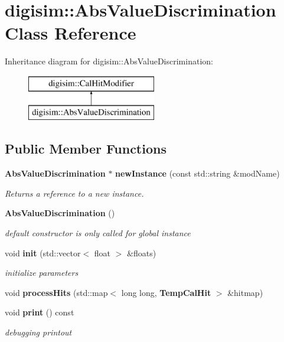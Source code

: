 \section{digisim\-:\-:Abs\-Value\-Discrimination Class Reference}
\label{classdigisim_1_1AbsValueDiscrimination}
Inheritance diagram for digisim\-:\-:Abs\-Value\-Discrimination\-:\begin{figure}[H]
\begin{center}
\leavevmode
\includegraphics[height=2.000000cm]{classdigisim_1_1AbsValueDiscrimination}
\end{center}
\end{figure}
\subsection*{Public Member Functions}
\begin{DoxyCompactItemize}
\item 
{\bf Abs\-Value\-Discrimination} $\ast$ {\bf new\-Instance} (const std\-::string \&mod\-Name)\label{classdigisim_1_1AbsValueDiscrimination_a1db92197f198684ebaace4c44eba3fc1}

\begin{DoxyCompactList}\small\item\em Returns a reference to a new instance. \end{DoxyCompactList}\item 
{\bf Abs\-Value\-Discrimination} ()\label{classdigisim_1_1AbsValueDiscrimination_ad39b38c00ab0eeb46c6ec2725f8efc26}

\begin{DoxyCompactList}\small\item\em default constructor is only called for global instance \end{DoxyCompactList}\item 
void {\bf init} (std\-::vector$<$ float $>$ \&floats)\label{classdigisim_1_1AbsValueDiscrimination_abb76d9c9d5cfca1b97c03c88546e2ff3}

\begin{DoxyCompactList}\small\item\em initialize parameters \end{DoxyCompactList}\item 
void {\bfseries process\-Hits} (std\-::map$<$ long long, {\bf Temp\-Cal\-Hit} $>$ \&hitmap)\label{classdigisim_1_1AbsValueDiscrimination_a496dc708cd67c488028a4dd32184d08a}

\item 
void {\bf print} () const \label{classdigisim_1_1AbsValueDiscrimination_a935f03f2376371399435dadaf72bb3a4}

\begin{DoxyCompactList}\small\item\em debugging printout \end{DoxyCompactList}\end{DoxyCompactItemize}
